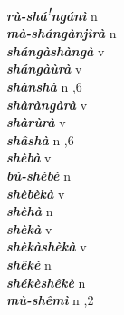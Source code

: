 \begin{multicols}{2}
{{\bfseries\itshape rù-shá\textsuperscript{!}ngánì}} \relax  n   \relax  {} \relax   \relax  \\
{{\bfseries\itshape mà-shángànjìrà}} \relax  n   \relax  {} \relax   \relax  \\
{{\bfseries\itshape shángàshàngà}} \relax  v  \relax   \relax  {} \relax   \relax  \\
{{\bfseries\itshape shángàùrà}} \relax  v  \relax   \relax  {} \relax   \relax  \\
{{\bfseries\itshape shànshà}} \relax  n  ,6  \relax   \relax  \\
{{\bfseries\itshape shàràngàrà}} \relax  v  \relax   \relax  {} \relax   \relax  \\
{{\bfseries\itshape shàrùrà}} \relax  v  \relax   \relax  {} \relax   \relax  \\
{{\bfseries\itshape shâshà}} \relax  n  ,6  \relax   \relax  \\
{{\bfseries\itshape shèbà}} \relax  v  \relax  {} \relax   \relax  \\
{{\bfseries\itshape bù-shèbè}} \relax  n   \relax  {} \relax   \relax  \\
{{\bfseries\itshape shèbèkà}} \relax  v  \relax   \relax  {} \relax   \relax  \\
{{\bfseries\itshape shèhà}} \relax  n   \relax  {} \relax   \relax  \\
{{\bfseries\itshape shèkà}} \relax  v  \relax   \relax  {} \relax   \relax  \\
{{\bfseries\itshape shèkàshèkà}} \relax  v  \relax   \relax  {} \relax   \relax  \\
{{\bfseries\itshape shêkè}} \relax  n   \relax  {} \relax   \relax  \\
{{\bfseries\itshape shékèshêkè}} \relax  n   \relax  {} \relax   \relax  \\
{{\bfseries\itshape mù-shêmì}} \relax  n  ,2  \relax   \relax  \\

\end{multicols}
